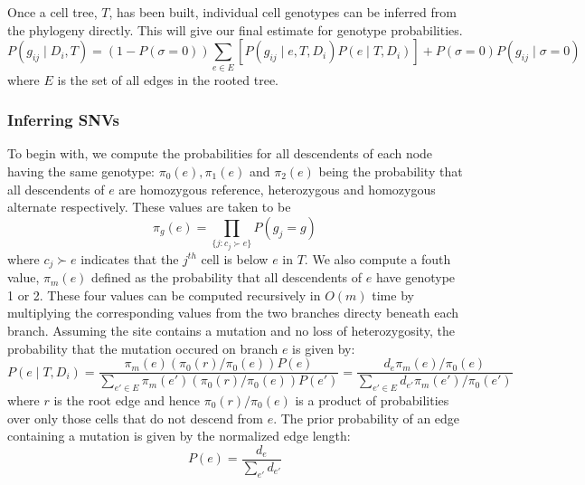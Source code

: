 \documentclass[../../main.tex]{subfiles}
\begin{document}
Once a cell tree, $T$, has been built, individual cell genotypes can be inferred from the phylogeny directly. This will give our final estimate for genotype probabilities.
\begin{equation*}
P(g_{ij}\mid D_i, T) = (1-P(\sigma=0))\sum_{e\in E} \left[ P(g_{ij}\mid e, T, D_i)P(e\mid T, D_i) \right] + P(\sigma = 0)P(g_{ij}\mid\sigma=0)
\end{equation*}
where $E$ is the set of all edges in the rooted tree.

\subsubsection*{Inferring SNVs}
To begin with, we compute the probabilities for all descendents of each node having the same genotype: $\pi_0(e), \pi_1(e)$ and $\pi_2(e)$ being the probability that all descendents of $e$ are homozygous reference, heterozygous and homozygous alternate respectively. These values are taken to be
\begin{equation*}
\pi_g(e) = \prod_{\{j:c_j\succ e\}} P(g_j = g)
\end{equation*}
where $c_j\succ e$ indicates that the $j^{th}$ cell is below $e$ in $T$. We also compute a fouth value, $\pi_m(e)$ defined as the probability that all descendents of $e$ have genotype 1 or 2. These four values can be computed recursively in $O(m)$ time by multiplying the corresponding values from the two branches directy beneath each branch. Assuming the site contains a mutation and no loss of heterozygosity, the probability that the mutation occured on branch $e$ is given by:
\begin{equation} \label{eq:edgemutpost}
P(e\mid T, D_i) = \frac{\pi_m(e)(\pi_0(r)/\pi_0(e))P(e)}{\sum_{e'\in E}\pi_m(e')(\pi_0(r)/\pi_0(e))P(e')} = \frac{d_e\pi_m(e)/\pi_0(e)}{\sum_{e'\in E} d_{e'}\pi_m(e')/\pi_0(e')}
\end{equation}
where $r$ is the root edge and hence $\pi_0(r)/\pi_0(e)$ is a product of probabilities over only those cells that do not descend from $e$. The prior probability of an edge containing a mutation is given by the normalized edge length:
\begin{equation*}
P(e) = \frac{d_e}{\sum_{e'} d_{e'}}
\end{equation*}
\end{document}
